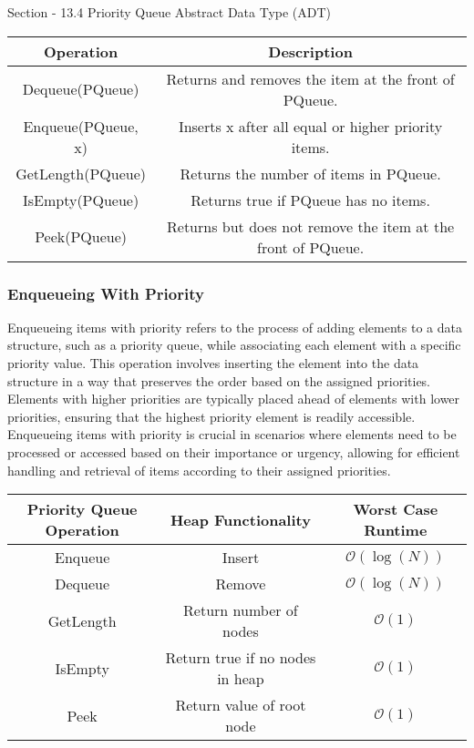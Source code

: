 \begin{notes}{Section - 13.4 Priority Queue Abstract Data Type (ADT)}
    \begin{center}
        \begin{tabular}[ht]{|c|c|}
            \hline \textbf{Operation} & \textbf{Description} \\ \hline
            Dequeue(PQueue) & Returns and removes the item at the front of PQueue. \\ \hline
            Enqueue(PQueue, x) & Inserts x after all equal or higher priority items. \\ \hline
            GetLength(PQueue) & Returns the number of items in PQueue. \\ \hline
            IsEmpty(PQueue) & Returns true if PQueue has no items. \\ \hline
            Peek(PQueue) & Returns but does not remove the item at the front of PQueue. \\ \hline
        \end{tabular}
    \end{center}
    
    \subsubsection*{Enqueueing With Priority}
    
    Enqueueing items with priority refers to the process of adding elements to a data structure, such as a priority queue, while associating each element with a specific priority value. This operation involves 
    inserting the element into the data structure in a way that preserves the order based on the assigned priorities. Elements with higher priorities are typically placed ahead of elements with lower priorities, 
    ensuring that the highest priority element is readily accessible. Enqueueing items with priority is crucial in scenarios where elements need to be processed or accessed based on their importance or urgency, 
    allowing for efficient handling and retrieval of items according to their assigned priorities.
    
    \begin{center}
        \begin{tabular}[ht]{|c|c|c|}
            \hline \textbf{Priority Queue Operation} & \textbf{Heap Functionality} & \textbf{Worst Case Runtime} \\ \hline
            Enqueue & Insert & $\mathcal{O}(\log{(N)})$ \\ \hline
            Dequeue & Remove & $\mathcal{O}(\log{(N)})$ \\ \hline
            GetLength & Return number of nodes & $\mathcal{O}(1)$ \\ \hline
            IsEmpty & Return true if no nodes in heap & $\mathcal{O}(1)$ \\ \hline
            Peek & Return value of root node & $\mathcal{O}(1)$ \\ \hline
        \end{tabular}
    \end{center}
\end{notes}

